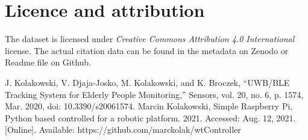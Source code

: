 \documentclass[conference]{IEEEtran}
\begin{document}
\section{Licence and attribution}

The dataset is licensed under \textit{Creative Commons Attribution 4.0 International} license. The actual citation data can be found in the metadata on Zenodo or Readme file on Github.




\begin{thebibliography}{00} 
 J. Kolakowski, V. Djaja-Josko, M. Kolakowski, and K. Broczek, “UWB/BLE Tracking System for Elderly People Monitoring,” Sensors, vol. 20, no. 6, p. 1574, Mar. 2020, doi: 10.3390/s20061574.
 Marcin Kolakowski, Simple Raspberry Pi, Python based controlled for a robotic platform. 2021. Accessed: Aug. 12, 2021. [Online]. Available: https://github.com/marckolak/wtController


\end{thebibliography}
\vspace{12pt}
\color{red}
\end{document}
